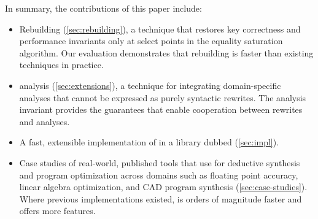 \begin{samepage}
In summary, the contributions of this paper include:
\begin{itemize}
\item Rebuilding (\autoref{sec:rebuilding}),
  a technique that restores key correctness and performance invariants
  only at select points in the equality saturation algorithm.
  Our evaluation demonstrates that rebuilding is faster than
  existing techniques in practice.

\item \Eclass analysis (\autoref{sec:extensions}),
  a technique for integrating domain-specific analyses
  that cannot be expressed as purely syntactic rewrites.
  The \eclass analysis invariant provides the guarantees
  that enable cooperation between rewrites and analyses.




\item A fast, extensible implementation of
  \egraphs in a library dubbed \egg (\autoref{sec:impl}).

\item Case studies of real-world, published tools that use \egg
    for deductive synthesis and program optimization across domains such as
    floating point accuracy,
    linear algebra optimization,
    and CAD program synthesis
    (\autoref{sec:case-studies}).
    Where previous implementations existed,
      \egg is orders of magnitude faster and offers more features.
\end{itemize}
\end{samepage}


